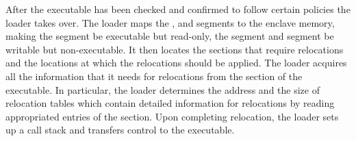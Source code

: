  After the executable has been checked and confirmed to
follow certain policies the loader takes over. The loader maps the ,
 and  segments to the enclave memory, making the
 segment be executable but read-only, the  segment and
 segment be writable but non-executable. It then locates the sections
that require relocations and the locations at which the relocations should be
applied. The loader acquires all the information that it needs for relocations
from the  section of the executable. In particular, the loader
determines the address and the size of relocation tables which contain detailed
information for relocations by reading appropriated entries of the
 section. Upon completing relocation, the loader sets up a call
stack and transfers control to the executable.
